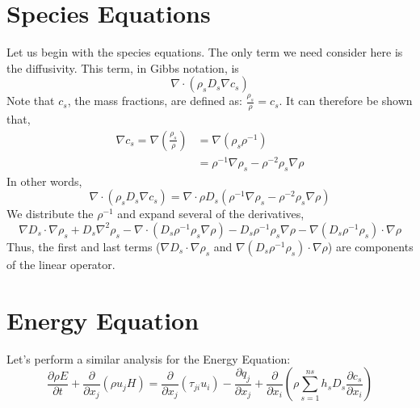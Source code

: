 \documentclass[10pt]{article}
\begin{document}
\section{Species Equations}
Let us begin with the species equations. The only term we need consider here is the diffusivity. 
This term, in Gibbs notation, is 
\begin{equation}
  \nabla \cdot (\rho_s D_s \nabla c_s)
\end{equation}
Note that $c_s$, the mass fractions, are defined as: $\frac{\rho_s}{\rho} = c_s$. 
It can therefore be shown that, 
\begin{eqnarray}
  \nabla c_s = \nabla (\frac{\rho_s}{\rho}) &= \nabla (\rho_s \rho^{-1})\\
             &= \rho^{-1} \nabla \rho_s - \rho^{-2} \rho_s \nabla \rho
\end{eqnarray}
In other words, 
\begin{equation}
  \nabla \cdot (\rho_s D_s \nabla c_s) = \nabla \cdot \rho D_s (\rho^{-1} \nabla \rho_s - \rho^{-2} \rho_s \nabla \rho)
\end{equation}
We distribute the $\rho^{-1}$ and expand several of the derivatives,
\begin{equation}
  \nabla D_s \cdot \nabla \rho_s + D_s \nabla^2 \rho_s - \nabla \cdot (D_s \rho^{-1} \rho_s \nabla \rho) - D_s \rho^{-1} \rho_s \nabla \rho - \nabla(D_s \rho^{-1} \rho_s) \cdot \nabla \rho
\end{equation}
Thus, the first and last terms ($\nabla D_s \cdot \nabla \rho_s$ and $\nabla(D_s \rho^{-1} \rho_s) \cdot \nabla \rho$) are components of the linear operator. 

\section{Energy Equation}

Let's perform a similar analysis for the Energy Equation:
\begin{equation}
\frac{\partial \rho E}{\partial t} + \frac{\partial }{\partial x_j}(\rho
u_j H) = \frac{\partial }{\partial x_j}(\tau_{ji}u_i) - \frac{\partial
q_j}{\partial x_j} + \frac{\partial }{\partial x_i}(\rho \sum^{ns}_{s=1}
h_s D_s \frac{\partial c_s}{\partial x_i})
\end{equation}
\end{document}
